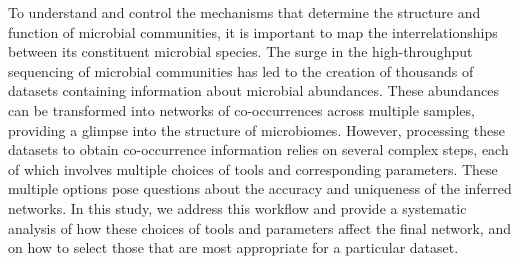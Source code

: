 To understand and control the mechanisms that determine the structure and function of microbial communities, it is important to map the interrelationships between its constituent microbial species. The surge in the high-throughput sequencing of microbial communities has led to the creation of thousands of datasets containing information about microbial abundances. These abundances can be transformed into networks of co-occurrences across multiple samples, providing a glimpse into the structure of microbiomes. However, processing these datasets to obtain co-occurrence information relies on several complex steps, each of which involves multiple choices of tools and corresponding parameters. These multiple options pose questions about the accuracy and uniqueness of the inferred networks. In this study, we address this workflow and provide a systematic analysis of how these choices of tools and parameters affect the final network, and on how to select those that are most appropriate for a particular dataset.